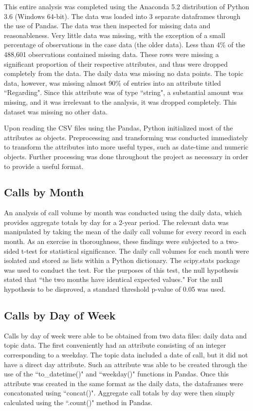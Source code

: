 \documentclass[11pt,twocolumn]{article}
\begin{document}
This entire analysis was completed using the Anaconda 5.2 distribution of Python 3.6 (Windows 64-bit).  The data was loaded into 3 separate dataframes through the use of Pandas.  The data was then inspected for missing data and reasonableness.  Very little data was missing, with the exception of a small percentage of observations in the case data (the older data).  Less than 4\% of the 488,601 observations contained missing data.  These rows were missing a significant proportion of their respective attributes, and thus were dropped completely from the data.  The daily data was missing no data points.  The topic data, however, was missing almost 90\% of entries into an attribute titled ``Regarding".  Since this attribute was of type ``string", a substantial amount was missing, and it was irrelevant to the analysis, it was dropped completely.  This dataset was missing no other data.
\par
Upon reading the CSV files using the Pandas, Python initialized most of the attributes as objects.  Preprocessing and transforming was conducted immediately to transform the attributes into more useful types, such as date-time and numeric objects.  Further processing was done throughout the project as necessary in order to provide a useful format.

	\subsection{Calls by Month}

An analysis of call volume by month was conducted using the daily data, which provides aggregate totals by day for a 2-year period. The relevant data was manipulated by taking the mean of the daily call volume for every record in each month.  As an exercise in thoroughness, these findings were subjected to a two-sided t-test for statistical significance.  The daily call volumes for each month were isolated and stored as lists within a Python dictionary.  The scipy.stats package was used to conduct the test.  For the purposes of this test, the null hypothesis stated that ``the two months have identical expected values."  For the null hypothesis to be disproved, a standard threshold p-value of 0.05 was used.

	\subsection{Calls by Day of Week}

Calls by day of week were able to be obtained from two data files:  daily data and topic data.  The first conveniently had an attribute consisting of an integer corresponding to a weekday.  The topic data included a date of call, but it did not have a direct day attribute.  Such an attribute was able to be created through the use of the ``to\_datetime()" and ``weekday()" functions in Pandas.  Once this attribute was created in the same format as the daily data, the dataframes were concatonated using ``concat()".  Aggregate call totals by day were then simply calculated using the ``.count()" method in Pandas.
\end{document}
